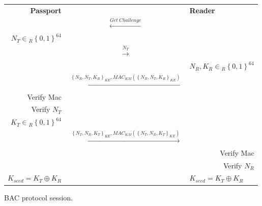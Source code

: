 \documentclass{acm_proc_article-sp}
\begin{document}

\begin{figure*}[t]
  \centering
	\begin{tabular}{p{3.8cm}cp{4.5cm}}
		\multicolumn{1}{r}{\textbf{Passport}} & &
        \multicolumn{1}{l}{\textbf{Reader}}\\ 	
        &$\xleftarrow{ Get\ Challenge }$& \\
		\multicolumn{1}{r}{$N_T \in{_R \left\{{0,1}\right\}}^{64}$} & & \\               
		&$\xrightarrow{ N_T }$& \\
		
        &&\multicolumn{1}{l}{$N_R,K_R \in{_R \left\{{0,1}\right\}}^{64}$}\\ 
		&$\xleftarrow{\left\{{N_R,N_T,K_R}\right\}_{KE},MAC_{KM}(\left\{{N_R,N_T,K_R}\right\}_{KE})}$& \\
		\multicolumn{1}{r}{Verify Mac} & & \\
		\multicolumn{1}{r}{Verify $N_T$} & & \\				
		\multicolumn{1}{r}{$K_T \in{_R \left\{{0,1}\right\}}^{64}$} & & \\               		
		&$\xrightarrow{\left\{{N_T,N_R,K_T}\right\}_{KE},MAC_{KM}(\left\{{N_T,N_R,K_T}\right\}_{KE})}$& \\
		&&\multicolumn{1}{r}{Verify Mac}\\
		&&\multicolumn{1}{r}{Verify $N_R$}\\
		\multicolumn{1}{r}{$K_{seed} = K_T\oplus{}K_R $} & &
        \multicolumn{1}{l}{$K_{seed} = K_T\oplus{}K_R $}\\		
	\end{tabular}
  \caption{BAC protocol session.}
  \label{fig:fig1}
\end{figure*}
\end{document}

